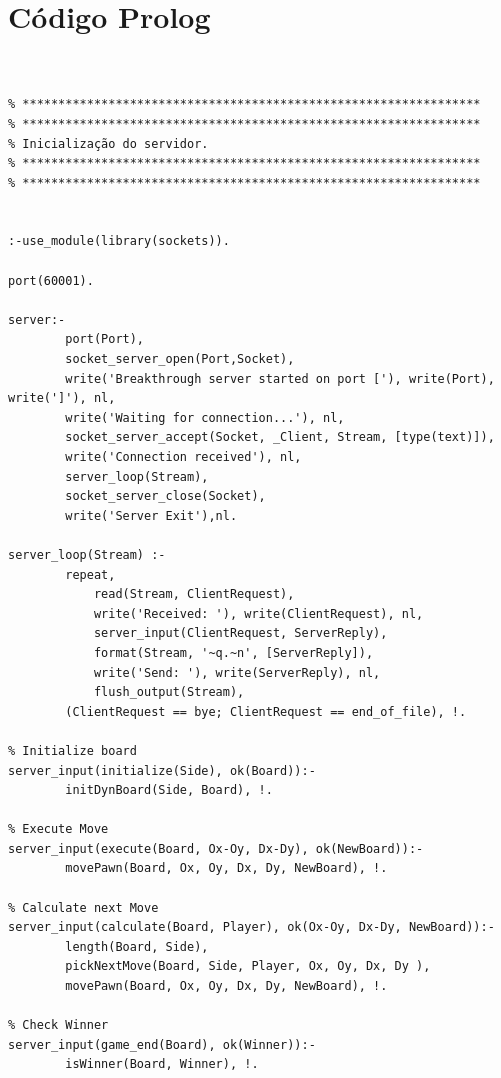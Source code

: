 \documentclass[15pt,a4paper]{article}
\begin{document}
\nocite{breakSite}
\nocite{tut1}
\nocite{tut2}


\newpage

\appendix
\section{Código Prolog}


\begin{lstlisting}


% ****************************************************************
% ****************************************************************
% Inicialização do servidor.
% ****************************************************************
% ****************************************************************


:-use_module(library(sockets)).

port(60001).

server:-
		port(Port),
		socket_server_open(Port,Socket),
		write('Breakthrough server started on port ['), write(Port), write(']'), nl,
		write('Waiting for connection...'), nl,
		socket_server_accept(Socket, _Client, Stream, [type(text)]),
		write('Connection received'), nl,
		server_loop(Stream),
		socket_server_close(Socket),
		write('Server Exit'),nl.

server_loop(Stream) :-
		repeat,
			read(Stream, ClientRequest),
			write('Received: '), write(ClientRequest), nl, 
			server_input(ClientRequest, ServerReply),
			format(Stream, '~q.~n', [ServerReply]),
			write('Send: '), write(ServerReply), nl, 
			flush_output(Stream),
		(ClientRequest == bye; ClientRequest == end_of_file), !.

% Initialize board
server_input(initialize(Side), ok(Board)):- 
		initDynBoard(Side, Board), !.

% Execute Move	
server_input(execute(Board, Ox-Oy, Dx-Dy), ok(NewBoard)):- 
		movePawn(Board, Ox, Oy, Dx, Dy, NewBoard), !.

% Calculate next Move
server_input(calculate(Board, Player), ok(Ox-Oy, Dx-Dy, NewBoard)):- 
		length(Board, Side),
		pickNextMove(Board, Side, Player, Ox, Oy, Dx, Dy ),
		movePawn(Board, Ox, Oy, Dx, Dy, NewBoard), !.
	
% Check Winner
server_input(game_end(Board), ok(Winner)):- 
		isWinner(Board, Winner), !.
	

\end{lstlisting}
\end{document}
